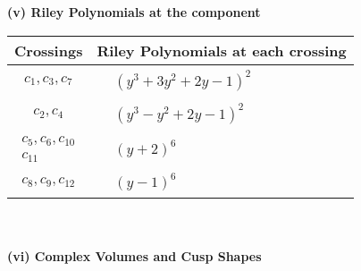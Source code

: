 \documentclass[1p]{elsarticle_modified}
\theoremstyle{definition}
\begin{document}
\newpage\renewcommand{\arraystretch}{1}
\flushleft \textbf{(v) Riley Polynomials at the component}\newline \\
\begin{tabular}{m{50pt}|m{274pt}}
Crossings & \hspace{64pt}Riley Polynomials at each crossing \\
\hline $$\begin{aligned}c_{1},c_{3},c_{7}\end{aligned}$$&$\begin{aligned}
&(y^3+3 y^2+2 y-1)^2
\end{aligned}$\\
\hline $$\begin{aligned}c_{2},c_{4}\end{aligned}$$&$\begin{aligned}
&(y^3- y^2+2 y-1)^2
\end{aligned}$\\
\hline $$\begin{aligned}c_{5},c_{6},c_{10}\\c_{11}\end{aligned}$$&$\begin{aligned}
&(y+2)^6
\end{aligned}$\\
\hline $$\begin{aligned}c_{8},c_{9},c_{12}\end{aligned}$$&$\begin{aligned}
&(y-1)^6
\end{aligned}$\\
\hline
\end{tabular}\\~\\
\newpage\flushleft \textbf{(vi) Complex Volumes and Cusp Shapes}
\end{document}
